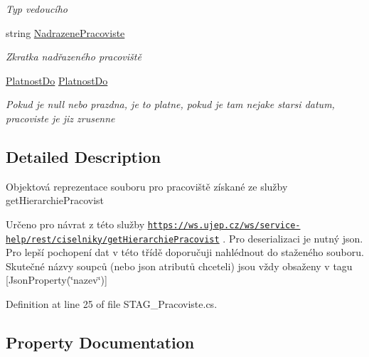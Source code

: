 \begin{DoxyCompactItemize}
\begin{DoxyCompactList}\small\item\em Typ vedoucího \end{DoxyCompactList}\item 
string \hyperlink{class_analyza_rozvrhu_1_1_s_t_a_g___classes_1_1_pracoviste_ab40ca9c3c73dd030b152448273b18060}{Nadrazene\+Pracoviste}
\begin{DoxyCompactList}\small\item\em Zkratka nadřazeného pracoviště \end{DoxyCompactList}\item 
\hyperlink{class_analyza_rozvrhu_1_1_s_t_a_g___classes_1_1_platnost_do}{Platnost\+Do} \hyperlink{class_analyza_rozvrhu_1_1_s_t_a_g___classes_1_1_pracoviste_a4ff0921a25c916a94e23a62a4ee103b2}{Platnost\+Do}
\begin{DoxyCompactList}\small\item\em Pokud je null nebo prazdna, je to platne, pokud je tam nejake starsi datum, pracoviste je jiz zrusenne \end{DoxyCompactList}\end{DoxyCompactItemize}


\subsection{Detailed Description}
Objektová reprezentace souboru pro pracoviště získané ze služby get\+Hierarchie\+Pracovist 

Určeno pro návrat z této služby \href{https://ws.ujep.cz/ws/service-help/rest/ciselniky/getHierarchiePracovist}{\tt https\+://ws.\+ujep.\+cz/ws/service-\/help/rest/ciselniky/get\+Hierarchie\+Pracovist} . Pro deserializaci je nutný json. Pro lepší pochopení dat v této třídě doporučuji nahlédnout do staženého souboru. Skutečné názvy soupců (nebo json atributů chceteli) jsou vždy obsaženy v tagu \mbox{[}Json\+Property(\char`\"{}nazev\char`\"{})\mbox{]} 

Definition at line 25 of file S\+T\+A\+G\+\_\+\+Pracoviste.\+cs.



\subsection{Property Documentation}
\mbox{\label{class_analyza_rozvrhu_1_1_s_t_a_g___classes_1_1_pracoviste_ade32248db7e2c1e7a7a97c57cad95f75}} 
